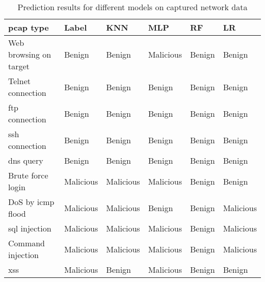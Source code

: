 \begin{table}[htbp]
    \centering
    \caption{Prediction results for different models on captured network data}
    \label{tab:table-final-results}
    \begin{tabular}{|l|l|l|l|l|l|}
        \hline
        \textbf{\gls{pcap} type}      & \textbf{Label} & \textbf{KNN} & \textbf{MLP} & \textbf{RF} & \textbf{LR} \\ \hline
        Web browsing on target        & Benign         & Benign       & Malicious    & Benign      & Benign                       \\ \hline
        Telnet connection             & Benign         & Benign       & Benign       & Benign      & Benign                       \\ \hline
        \gls{ftp} connection          & Benign         & Benign       & Benign       & Benign      & Benign                       \\ \hline
        \gls{ssh} connection          & Benign         & Benign       & Benign       & Benign      & Benign                       \\ \hline
        \gls{dns} query               & Benign         & Benign       & Benign       & Benign      & Benign                       \\ \hline
        Brute force login             & Malicious      & Malicious    & Malicious    & Benign      & Benign                       \\ \hline
        \gls{DoS} by \gls{icmp} flood & Malicious      & Malicious    & Benign       & Benign      & Malicious                    \\ \hline
        \gls{sql} injection           & Malicious      & Malicious    & Malicious    & Benign      & Malicious                    \\ \hline
        Command injection             & Malicious      & Malicious    & Malicious    & Benign      & Malicious                    \\ \hline
        \gls{xss}                     & Malicious      & Benign       & Malicious    & Benign      & Benign                       \\ \hline
    \end{tabular}
\end{table}

